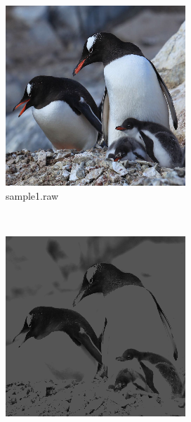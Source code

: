 \documentclass{article}
\begin{document}
\begin{figure}[!htb]
    \centering
    \begin{subfigure}[b]{0.3\textwidth}
        \includegraphics[width=\textwidth]{img/sample1.png}
        \caption{sample1.raw}
    \end{subfigure}
    ~
    \begin{subfigure}[b]{0.3\textwidth}
        \includegraphics[width=\textwidth]{img/gray.png}

\end{subfigure}
\end{figure}
\end{document}
